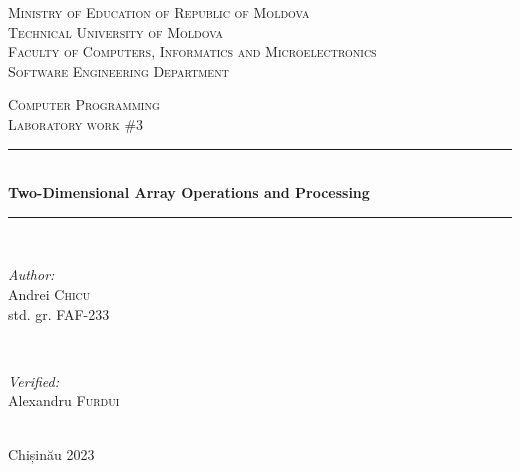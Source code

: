 \documentclass[12pt]{article}
\begin{document}
\begin{titlepage}
   \begin{center}
    \textsc{\large Ministry of Education of Republic of Moldova}\\[0.5cm]
    \textsc{\large Technical University of Moldova}\\[0.5cm]
    \textsc{\large Faculty of Computers, Informatics and Microelectronics}\\[0.5cm]
    \textsc{\large Software Engineering Department}\\[1.2cm]
    
    \vspace{25 mm}
    
    \textsc{\Large Computer Programming}\\[0.5cm]
    \textsc{\large Laboratory work \#3}\\[0.5cm]    %
    
    \newcommand{\HRule}{\rule{\linewidth}{0.5mm}}
    \vspace{10 mm}
    \HRule \\[0.4cm]
    { \LARGE \bfseries Two-Dimensional Array Operations and Processing }\\[0.4cm] %
    \HRule \\[1.5cm]
    
    \vspace{10mm}
    
    \begin{minipage}[t]{0.4\textwidth}
    \begin{flushleft} \large
    \emph{Author:} \\
    Andrei \textsc{Chicu}\\                         %
    std. gr. FAF-233                                %
    \end{flushleft}
    \end{minipage}
    ~
    \begin{minipage}[t]{0.4\textwidth}
    \begin{flushright} \large
    \emph{Verified:} \\
    Alexandru \textsc{Furdui}\\
    \end{flushright}
    \end{minipage}\\[3cm]
    
    \vspace{5 mm}
    \large Chișinău 2023\\[0.5cm]
    
    \vfill
    \end{center}
\end{titlepage}
\end{document}
